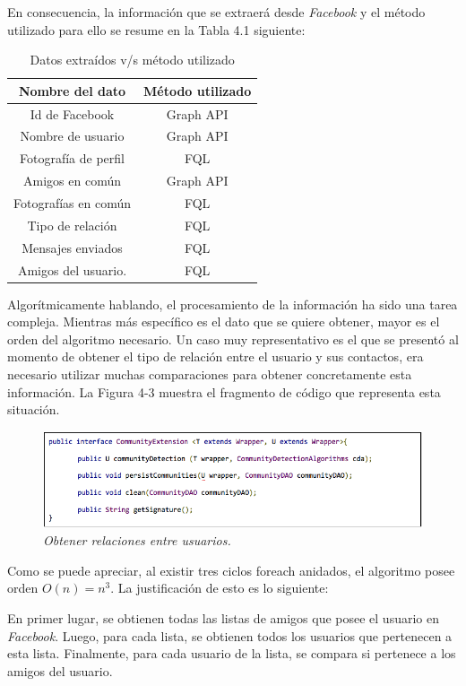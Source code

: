 En consecuencia, la información que se extraerá desde \textit{Facebook} y el método utilizado para ello se resume en la Tabla 4.1 siguiente:

\begin{table}[h]
	\begin{center}
		\caption[Datos extraídos v/s método utilizado.]{Datos extraídos v/s método utilizado}
		\label{tab:ex-tab01}
		\begin{tabular}{|c|c|}
			\hline 
			Nombre del dato & Método utilizado\tabularnewline
			\hline 
			\hline 
			Id de Facebook & Graph API\tabularnewline
			\hline 
			Nombre de usuario & Graph API\tabularnewline
			\hline 
			Fotografía de perfil & FQL\tabularnewline
			\hline 
			Amigos en común & Graph API\tabularnewline
			\hline 
			Fotografías en común & FQL\tabularnewline
			\hline 
			Tipo de relación & FQL\tabularnewline
			\hline 
			Mensajes enviados & FQL\tabularnewline
			\hline 
			Amigos del usuario. & FQL\tabularnewline
			\hline 
		\end{tabular}
	\end{center}
\end{table}

Algorítmicamente hablando, el procesamiento de la información ha sido una tarea compleja. Mientras más específico es el dato que se quiere obtener, mayor es el orden del algoritmo necesario. Un caso muy representativo es el que se presentó al momento de obtener el tipo de relación entre el usuario y sus contactos, era necesario utilizar muchas comparaciones para obtener concretamente esta información. La Figura 4-3 muestra el fragmento de código que representa esta situación.

\begin{figure}
	\centering
	\includegraphics[scale=1]{images/Figura4-3}
	\caption{\em Obtener relaciones entre usuarios.}
	\label{fig:ext-im3}
\end{figure}

Como se puede apreciar, al existir tres ciclos foreach anidados, el algoritmo posee orden $O(n)=n^3$. La justificación de esto es lo siguiente:

En primer lugar, se obtienen todas las listas de amigos que posee el usuario en \textit{Facebook}. Luego, para cada lista, se obtienen todos los usuarios que pertenecen a esta lista. Finalmente, para cada usuario de la lista, se compara si pertenece a los amigos del usuario. 

